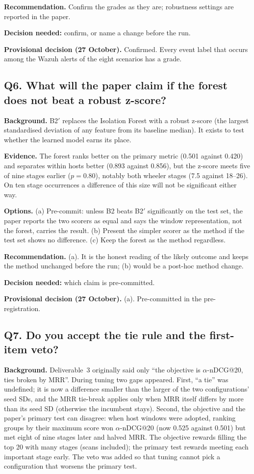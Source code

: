 \documentclass[10.5pt,a4paper]{article}
\newcommand{\rec}[1]{\par\smallskip\noindent\colorbox{gray!12}{\parbox{\dimexpr\linewidth-2\fboxsep}{\textbf{Recommendation.} #1}}\par\smallskip}
\newcommand{\ask}[1]{\par\noindent\textbf{Decision needed:} #1\par\medskip}
\newcommand{\dec}[1]{\par\smallskip\noindent\colorbox{blue!8}{\parbox{\dimexpr\linewidth-2\fboxsep}{\textbf{Provisional decision (27 October).} #1}}\par\medskip}
\newcommand{\sub}[1]{\par\smallskip\noindent\textbf{#1}\quad}
\begin{document}
\rec{Confirm the grades as they are; robustness settings are reported in the paper.}
\ask{confirm, or name a change before the run.}
\dec{Confirmed. Every event label that occurs among the Wazuh alerts of the eight scenarios has a grade.}

\subsection*{Q6. What will the paper claim if the forest does not beat a robust z-score?}

\sub{Background.} B2$'$ replaces the Isolation Forest with a robust z-score (the largest standardised deviation of any feature from its baseline median). It exists to test whether the learned model earns its place.

\sub{Evidence.} The forest ranks better on the primary metric (0.501 against 0.420) and separates within hosts better (0.893 against 0.856), but the z-score meets five of nine stages earlier ($p = 0.80$), notably both wheeler stages (7.5 against 18--26). On ten stage occurrences a difference of this size will not be significant either way.

\sub{Options.} (a) Pre-commit: unless B2 beats B2$'$ significantly on the test set, the paper reports the two scorers as equal and says the window representation, not the forest, carries the result. (b) Present the simpler scorer as the method if the test set shows no difference. (c) Keep the forest as the method regardless.

\rec{(a). It is the honest reading of the likely outcome and keeps the method unchanged before the run; (b) would be a post-hoc method change.}
\ask{which claim is pre-committed.}
\dec{(a). Pre-committed in the pre-registration.}

\subsection*{Q7. Do you accept the tie rule and the first-item veto?}

\sub{Background.} Deliverable~3 originally said only ``the objective is $\alpha$-nDCG@20, ties broken by MRR''. During tuning two gaps appeared. First, ``a tie'' was undefined; it is now a difference smaller than the larger of the two configurations' seed SDs, and the MRR tie-break applies only when MRR itself differs by more than its seed SD (otherwise the incumbent stays). Second, the objective and the paper's primary test can disagree: when host windows were adopted, ranking groups by their maximum score won $\alpha$-nDCG@20 (now 0.525 against 0.501) but met eight of nine stages later and halved MRR. The objective rewards filling the top 20 with many stages (scans included); the primary test rewards meeting each important stage early. The veto was added so that tuning cannot pick a configuration that worsens the primary test.
\end{document}
